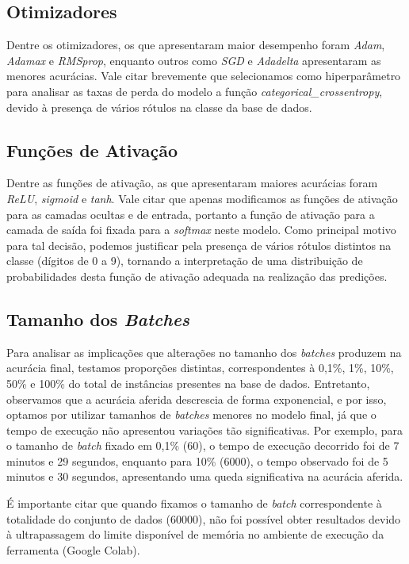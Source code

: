 \documentclass[a4paper, 12pt]{article}
\begin{document}
\subsection{Otimizadores}

Dentre os otimizadores, os que apresentaram maior desempenho foram \emph{Adam}, \emph{Adamax} e \emph{RMSprop}, enquanto outros como \emph{SGD} e \emph{Adadelta} apresentaram as menores acurácias. Vale citar brevemente que selecionamos como hiperparâmetro para analisar as taxas de perda do modelo a função \emph{categorical\_crossentropy}, devido à presença de vários rótulos na classe da base de dados.

\subsection{Funções de Ativação}

Dentre as funções de ativação, as que apresentaram maiores acurácias foram \emph{ReLU}, \emph{sigmoid} e \emph{tanh}. Vale citar que apenas modificamos as funções de ativação para as camadas ocultas e de entrada, portanto a função de ativação para a camada de saída foi fixada para a \emph{softmax} neste modelo. Como principal motivo para tal decisão, podemos justificar pela presença de vários rótulos distintos na classe (dígitos de 0 a 9), tornando a interpretação de uma distribuição de probabilidades desta função de ativação adequada na realização das predições.

\subsection{Tamanho dos \emph{Batches}}

Para analisar as implicações que alterações no tamanho dos \emph{batches} produzem na acurácia final, testamos proporções distintas, correspondentes à 0,1\%, 1\%, 10\%, 50\% e 100\% do total de instâncias presentes na base de dados. Entretanto, observamos que a acurácia aferida descrescia de forma exponencial, e por isso, optamos por utilizar tamanhos de \emph{batches} menores no modelo final, já que o tempo de execução não apresentou variações tão significativas. Por exemplo, para o tamanho de \emph{batch} fixado em 0,1\% (60), o tempo de execução decorrido foi de 7 minutos e 29 segundos, enquanto para 10\% (6000), o tempo observado foi de 5 minutos e 30 segundos, apresentando uma queda significativa na acurácia aferida.

É importante citar que quando fixamos o tamanho de \emph{batch} correspondente à totalidade do conjunto de dados (60000), não foi possível obter resultados devido à ultrapassagem do limite disponível de memória no ambiente de execução da ferramenta (Google Colab).
\end{document}
